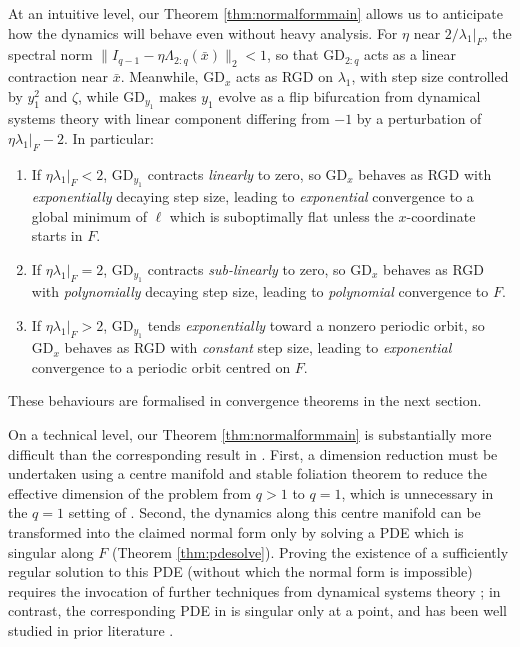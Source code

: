 \documentclass{article}
\newcommand{\GD}{\mathrm{GD}}
\theoremstyle{plain}
\theoremstyle{definition}
\theoremstyle{remark}
\begin{document}
At an intuitive level, our Theorem \ref{thm:normalformmain} allows us to anticipate how the dynamics will behave even without heavy analysis. For $\eta$ near $2/\lambda_1|_F$, the spectral norm $\|I_{q-1}-\eta\Lambda_{2:q}(\bar{x})\|_2<1$, so that $\GD_{2:q}$ acts as a linear contraction near $\bar{x}$. Meanwhile, $\GD_x$ acts as RGD on $\lambda_1$, with step size controlled by $y_1^2$ and $\zeta$, while $\GD_{y_1}$ makes $y_1$ evolve as a flip bifurcation from dynamical systems theory \cite{kuznetsov} with linear component differing from $-1$ by a perturbation of $\eta\lambda_1|_F-2$. In particular:
\begin{enumerate}[leftmargin=*]
    \item If $\eta\lambda_1|_F<2$, $\GD_{y_1}$ contracts \emph{linearly} to zero, so $\GD_x$ behaves as RGD with \emph{exponentially} decaying step size, leading to \emph{exponential} convergence to a global minimum of $\ell$ which is suboptimally flat unless the $x$-coordinate starts in $F$.
    \item If $\eta\lambda_1|_F=2$, $\GD_{y_1}$ contracts \emph{sub-linearly} to zero, so $\GD_x$ behaves as RGD with \emph{polynomially} decaying step size, leading to \emph{polynomial} convergence to $F$.
    \item If $\eta\lambda_1|_F>2$, $\GD_{y_1}$ tends \emph{exponentially} toward a nonzero periodic orbit, so $\GD_x$ behaves as RGD with \emph{constant} step size, leading to \emph{exponential} convergence to a periodic orbit centred on $F$.
\end{enumerate}
These behaviours are formalised in convergence theorems in the next section.

On a technical level, our Theorem \ref{thm:normalformmain} is substantially more difficult than the corresponding result in \cite{macdonaldeos}. First, a dimension reduction must be undertaken using a centre manifold and stable foliation theorem \cite{hpsinvariant, fenichel1974asymptotic,fenichel_singular} to reduce the effective dimension of the problem from $q>1$ to $q=1$, which is unnecessary in the $q=1$ setting of \cite{macdonaldeos}. Second, the dynamics along this centre manifold can be transformed into the claimed normal form only by solving a PDE which is singular along $F$ (Theorem \ref{thm:pdesolve}). Proving the existence of a sufficiently regular solution to this PDE (without which the normal form is impossible) requires the invocation of further techniques from dynamical systems theory \cite{belitskii1978,sternberg1957}; in contrast, the corresponding PDE in \cite{macdonaldeos} is singular only at a point, and has been well studied in prior literature \cite{singularpde}.
\end{document}
